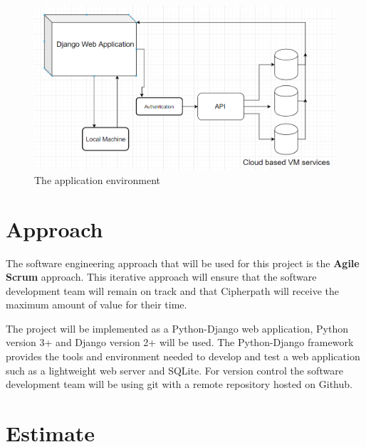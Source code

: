 \documentclass{article}
\begin{document}
    \begin{figure}[h]
    \includegraphics[scale=.7]{diagram}
        \caption{The application environment}
    \end{figure}

    \pagebreak
    \section{Approach}
    The software engineering approach that will be used for this project is the \textbf{Agile Scrum} approach.
    This iterative approach will ensure that the software development team will remain on track and that Cipherpath will receive the maximum amount of value
    for their time.

    The project will be implemented as a Python-Django web application, Python version 3+ and Django version 2+ will be used. The Python-Django framework provides the tools 
    and environment needed to develop and test a web application such as a lightweight web server and SQLite. For version control the software development team will be using git
    with a remote repository hosted on Github.

    \section{Estimate}

%
\end{document}
